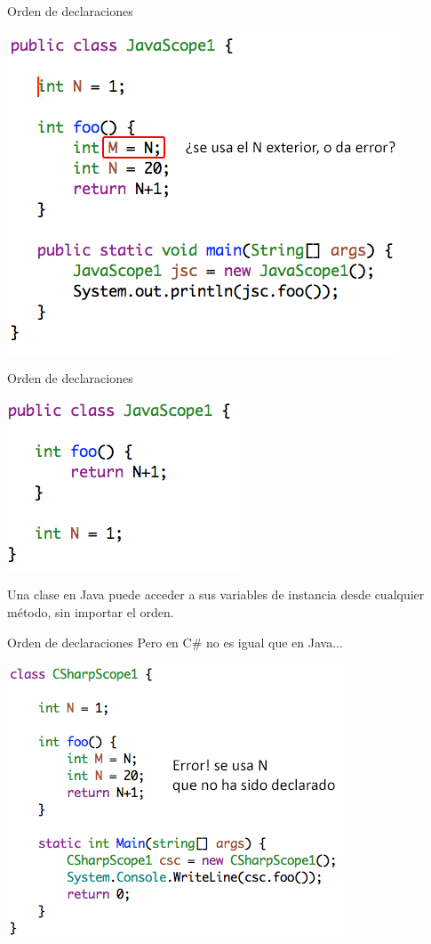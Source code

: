 \documentclass{beamer} %
\begin{document}
\begin{frame}{Orden de declaraciones}
    \begin{center}
        \includegraphics[width=.7\textwidth]{./image/cap5/scope-java}
    \end{center}
\end{frame}

\begin{frame}{Orden de declaraciones}
    \begin{center}
        \includegraphics[width=.5\textwidth]{./image/cap5/scope-java2}
    \end{center}
    Una clase en Java puede acceder a sus variables de instancia desde cualquier método, sin importar el orden.
\end{frame}

\begin{frame}{Orden de declaraciones}
    Pero en C\# no es igual que en Java...
    \begin{center}
        \includegraphics[width=.7\textwidth]{./image/cap5/scope-Csharp}
    \end{center}
\end{frame}
\end{document}
